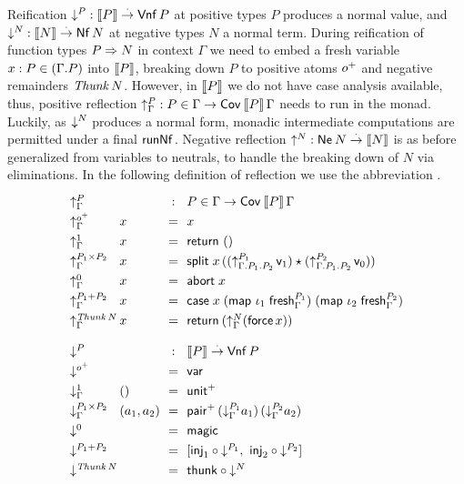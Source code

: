 \documentclass[sigplan,screen,fleqn]{acmart}
\begin{document}
Reification $\mathord{\downarrow_{}^{P}} : \mathopen{{[\kern-0.14em[}} P \mathclose{{]\kern-0.14em]}} \stackrel{\cdot}{\to} \mathsf{Vnf}\,P$ at positive types $P$ produces
a normal value, and $\mathord{\downarrow_{}^{N}} : \mathopen{{[\kern-0.14em[}} N \mathclose{{]\kern-0.14em]}} \stackrel{\cdot}{\to} \mathsf{Nf}\,N$ at negative
types $N$ a
normal term.  During reification of function types $P \Rightarrow N$ in
context $\Gamma$ we need to embed a fresh variable
$x : P \in (\Gamma.P)$ into $\mathopen{{[\kern-0.14em[}} P \mathclose{{]\kern-0.14em]}}$, breaking down $P$ to
positive atoms $o^+$ and negative remainders $\mathit{Thunk}\,N$.
However, in $\mathopen{{[\kern-0.14em[}} P \mathclose{{]\kern-0.14em]}}$ we do not have case analysis available, thus,
positive reflection $\mathord{\uparrow_{\Gamma}^{P}} : P \in \Gamma \to \mathsf{Cov}^{}\,\mathopen{{[\kern-0.14em[}} P \mathclose{{]\kern-0.14em]}}\,\Gamma$
needs to run in the monad.  Luckily, as $\mathord{\downarrow_{}^{N}}$ produces a normal
form, monadic intermediate computations are permitted under a final
$\mathsf{runNf}^{}$.  Negative reflection $\mathord{\uparrow_{}^{N}} : \mathsf{Ne}^{}\,N \stackrel{\cdot}{\to} \mathopen{{[\kern-0.14em[}} N \mathclose{{]\kern-0.14em]}}$ is as
before generalized from variables to neutrals, to handle the breaking
down of $N$ via eliminations.
%
In the following definition of reflection we use the abbreviation
.
\[
\def\arraystretch{1.3}
\begin{array}{l@{\,}l@{~~}c@{~~}l}
  \multicolumn 2 l {\upG P} & : & P \in \Gamma \to \Cov\,\den P \, \Gamma\\
  \upG {\patom}         & x & = & x \\
  \upG {\tyone}         & x & = & \treturn\;\ttempty \\
  \upG {P_1 \times P_2} & x & = & \tsplit\;x\,
    \left(
     (\up[\cext{\cext \Gamma {P_1}}{P_2}]{P_1}\,\vv1)
     \star
     (\up[\cext{\cext \Gamma {P_1}}{P_2}]{P_2}\,\vv0)
    \right) \\
  \upG{\tyzero}         & x & = & \tabort\;x \\
  \upG{P_1 + P_2}       & x & = & \tcase\;x
    \; (\tmap\;\iota_1\;\tfresh^{P_1}_\Gamma)
    \; (\tmap\;\iota_2\;\tfresh^{P_2}_\Gamma)
    \\
  \upG{\Thunk N} & x & = & \treturn\,(\upG N (\tforce\,x))
\\[2ex]
    \multicolumn 2 l {\down P} & : & \den P \todot \tVNf\,P \\
  \down {\patom} & & = & \tvar \\
  \downG {\tyone} & () & = & \punit \\
  \downG {P_1 \times P_2} & (a_1,a_2) & = & \ppair
    \,(\downG {P_1} a_1)
    \,(\downG {P_2} a_2)
    \\
  \down {\tyzero} & & = & \tmagic \\
  \down {P_1 + P_2} & & = &
    [  \tinj_1 \comp \down{P_1}
    ,\ \tinj_2 \comp \down{P_2}
    ] \\
  \down {\Thunk N} & & = & \tthunk \circ \down N \\
\end{array}
\]
\end{document}
